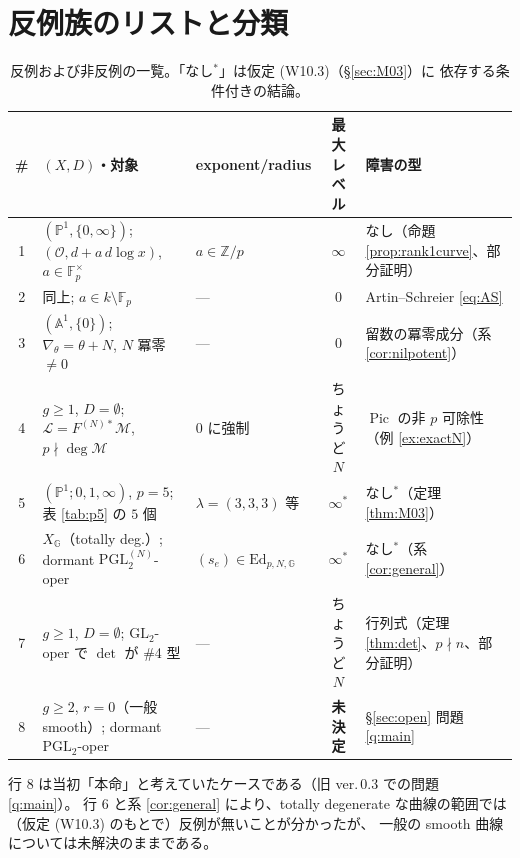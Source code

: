 \documentclass[a4paper,11pt]{ltjsarticle}
\theoremstyle{plain}
\theoremstyle{definition}
\newcommand{\bbA}{\mathbb{A}}
\newcommand{\bbP}{\mathbb{P}}
\newcommand{\bbZ}{\mathbb{Z}}
\newcommand{\bbF}{\mathbb{F}}
\newcommand{\cL}{\mathcal{L}}
\newcommand{\cM}{\mathcal{M}}
\newcommand{\cO}{\mathcal{O}}
\newcommand{\Pic}{\operatorname{Pic}}
\newcommand{\dlog}{d\!\log}
\begin{document}
\section{反例族のリストと分類}\label{sec:list}

\begin{table}[htbp]
\centering
\caption{反例および非反例の一覧。「なし$^{\ast}$」は仮定 (W10.3)（\S\ref{sec:M03}）に
依存する条件付きの結論。}
\label{tab:examples}
\footnotesize
\setlength{\tabcolsep}{3.5pt}
\begin{tabular}{cllcl}
\toprule
\# & $(X,D)$・対象 & exponent/radius & 最大レベル & 障害の型\\
\midrule
1 & $(\bbP^1,\{0,\infty\})$; $(\cO,d+a\,\dlog x)$, $a\in\bbF_p^\times$
  & $a\in\bbZ/p$ & $\infty$ & なし（命題 \ref{prop:rank1curve}、部分証明）\\[2pt]
2 & 同上; $a\in k\setminus\bbF_p$ & --- & $0$ & Artin--Schreier \eqref{eq:AS}\\[2pt]
3 & $(\bbA^1,\{0\})$; $\nabla_\theta=\theta+N$, $N$ 冪零 $\neq0$
  & --- & $0$ & 留数の冪零成分（系 \ref{cor:nilpotent}）\\[2pt]
4 & $g\ge1$, $D=\emptyset$; $\cL=F^{(N)*}\cM$, $p\nmid\deg\cM$
  & $0$ に強制 & ちょうど $N$ & $\Pic$ の非 $p$ 可除性（例 \ref{ex:exactN}）\\[2pt]
5 & $(\bbP^1;0,1,\infty)$, $p=5$; 表 \ref{tab:p5} の $5$ 個
  & $\lambda=(3,3,3)$ 等 & $\infty^{\ast}$ & なし$^{\ast}$（定理 \ref{thm:M03}）\\[2pt]
6 & $X_{\mathbb{G}}$（totally deg.）; dormant $\mathrm{PGL}_2^{(N)}$-oper
  & $(s_e)\in\mathrm{Ed}_{p,N,\mathbb{G}}$ & $\infty^{\ast}$ & なし$^{\ast}$（系 \ref{cor:general}）\\[2pt]
7 & $g\ge1$, $D=\emptyset$; $\mathrm{GL}_2$-oper で $\det$ が \#4 型
  & --- & ちょうど $N$ & 行列式（定理 \ref{thm:det}、$p\nmid n$、部分証明）\\[2pt]
8 & $g\ge2$, $r=0$（一般 smooth）; dormant $\mathrm{PGL}_2$-oper
  & --- & \textbf{未決定} & \S\ref{sec:open} 問題 \ref{q:main}\\
\bottomrule
\end{tabular}
\end{table}

行 8 は当初「本命」と考えていたケースである（旧 ver.\,0.3 での問題 \ref{q:main}）。
行 6 と系 \ref{cor:general} により、totally degenerate な曲線の範囲では
（仮定 (W10.3) のもとで）反例が無いことが分かったが、
一般の smooth 曲線については未解決のままである。
\end{document}
